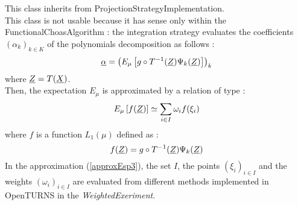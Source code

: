 This class inherits from ProjectionStrategyImplementation.\\

This class is not usable because it has sense only within the FunctionalChoasAlgorithm : the integration strategy evaluates the coefficients $(\alpha_k)_{k \in K}$ of the polynomials decomposition as follows :
\begin{equation}\label{defEsp}
{\underline{\alpha}} = \left( E_{\mu} \left[ g \circ T^{-1}({\underline{Z}}) \Psi_k ({\underline{Z}}) \right]\right)_k
\end{equation}
where ${\underline{Z}} = T({\underline{X}})$.\\
Then, the expectation $ E_{\mu}$ is approximated by a relation of type :
\begin{equation}\label{approxEsp3}
E_{\mu} \left[ f({\underline{Z}}) \right] \simeq \sum_{i \in I} \omega_i f(\xi_i)
\end{equation}
where $f$ is a function $L_1(\mu)$ defined as :
\begin{equation}\label{fEsp}
f({\underline{Z}}) = g \circ T^{-1}({\underline{Z}}) \Psi_k ({\underline{Z}})
\end{equation}
In the approximation (\ref{approxEsp3}), the set $I$, the points $(\xi_i)_{i \in I}$ and the weights $(\omega_i)_{i \in I}$ are evaluated from different methods implemented in OpenTURNS in the \emph{WeightedExeriment}.



